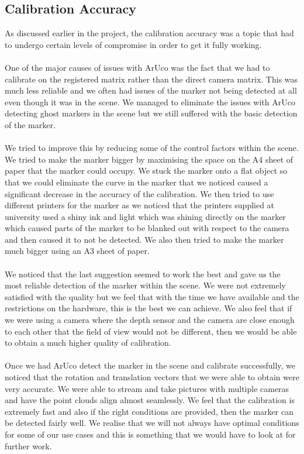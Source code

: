 \documentclass{article}
\begin{document}
\subsection{Calibration Accuracy}
As discussed earlier in the project, the calibration accuracy was a topic that had to undergo certain levels of compromise in order to get it fully working.
\\\\
One of the major causes of issues with ArUco was the fact that we had to calibrate on the registered matrix rather than the direct camera matrix. This was much less reliable and we often had issues of the marker not being detected at all even though it was in the scene. We managed to eliminate the issues with ArUco detecting ghost markers in the scene but we still suffered with the basic detection of the marker.
\\\\
We tried to improve this by reducing some of the control factors within the scene. We tried to make the marker bigger by maximising the space on the A4 sheet of paper that the marker could occupy. We stuck the marker onto a flat object so that we could eliminate the curve in the marker that we noticed caused a significant decrease in the accuracy of the calibration. We then tried to use different printers for the marker as we noticed that the printers supplied at university used a shiny ink and light which was shining directly on the marker which caused parts of the marker to be blanked out with respect to the camera and then caused it to not be detected. We also then tried to make the marker much bigger using an A3 sheet of paper.
\\\\
We noticed that the last suggestion seemed to work the best and gave us the most reliable detection of the marker within the scene. We were not extremely satisfied with the quality but we feel that with the time we have available and the restrictions on the hardware, this is the best we can achieve. We also feel that if we were using a camera where the depth sensor and the camera are close enough to each other that the field of view would not be different, then we would be able to obtain a much higher quality of calibration.
\\\\
Once we had ArUco detect the marker in the scene and calibrate successfully, we noticed that the rotation and translation vectors that we were able to obtain were very accurate. We were able to stream and take pictures with multiple cameras and have the point clouds align almost seamlessly. We feel that the calibration is extremely fast and also if the right conditions are provided, then the marker can be detected fairly well. We realise that we will not always have optimal conditions for some of our use cases and this is something that we would have to look at for further work.
\\\\
\end{document}
